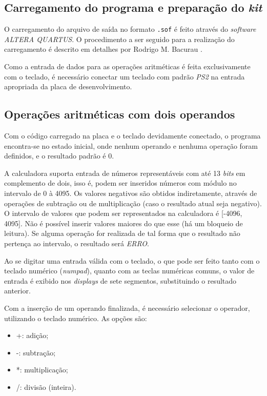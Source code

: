 \documentclass[a4paper,11pt]{article}
\begin{document}
\subsection{Carregamento do programa e preparação do \textit{kit}}

O carregamento do arquivo de saída no formato \texttt{.sof} é feito através do \textit{software ALTERA QUARTUS}. O procedimento a ser seguido para a realização do carregamento é descrito em detalhes por Rodrigo M. Bacurau \cite{bacurau_intro}.

Como a entrada de dados para as operações aritméticas é feita exclusivamente com o teclado, é necessário conectar um teclado com padrão \textit{PS2} na entrada apropriada da placa de desenvolvimento.

\subsection{Operações aritméticas com dois operandos}

Com o código carregado na placa e o teclado devidamente conectado, o programa encontra-se no estado inicial, onde nenhum operando e nenhuma operação foram definidos, e o resultado padrão é 0.

A calculadora suporta entrada de números representáveis com até 13 \textit{bits} em complemento de dois, isso é, podem ser inseridos números com módulo no intervalo de 0 à 4095. Os valores negativos são obtidos indiretamente, através de operações de subtração ou de multiplicação (caso o resultado atual seja negativo). O intervalo de valores que podem ser representados na calculadora é [-4096, 4095]. Não é possível inserir valores maiores do que esse (há um bloqueio de leitura). Se alguma operação for realizada de tal forma que o resultado não pertença ao intervalo, o resultado será \textit{ERRO}.

Ao se digitar uma entrada válida com o teclado, o que pode ser feito tanto com o teclado numérico (\textit{numpad}), quanto com as teclas numéricas comuns, o valor de entrada é exibido nos \textit{displays} de sete segmentos, substituindo o resultado anterior.

Com a inserção de um operando finalizada, é necessário selecionar o operador, utilizando o teclado numérico. As opções são:

\begin{itemize}
	\item +: adição;
	\item -: subtração;
	\item *: multiplicação;
	\item /: divisão (inteira).
\end{itemize}
\end{document}
